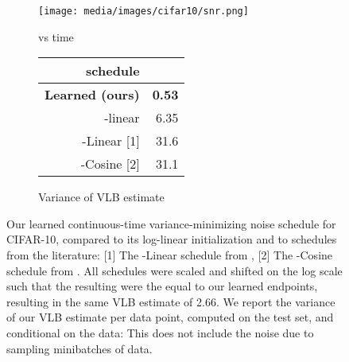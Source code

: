 \documentclass{article}
\begin{document}
\begin{figure}[t]
    \centering\footnotesize
    \begin{subfigure}[b]{0.35\textwidth}
        \centering
        \texttt{[image: media/images/cifar10/snr.png]}
        \caption{ vs time  }
        \label{fig:snr_schedule}
    \end{subfigure}\hspace{1.5cm}
    \begin{subfigure}[b]{0.35\textwidth}  
        \centering
        \begin{tabular}{rr}
        ~schedule & \\
        \midrule
        \textbf{Learned (ours)} & \textbf{0.53}\\
        -linear & 6.35\\
        -Linear [1] & 31.6\\
        -Cosine [2] & 31.1\\
        \bottomrule
        \end{tabular}
        \caption{Variance of VLB estimate}
        \label{table:variance}
    \end{subfigure}
    \caption{Our learned continuous-time variance-minimizing noise schedule  for CIFAR-10, compared to its log-linear initialization and to schedules from the literature: [1] The -Linear schedule from \cite{ho2020denoising}, [2] The -Cosine schedule from \cite{nichol2021improved}. All schedules were scaled and shifted on the log scale such that the resulting  were the equal to our learned endpoints, resulting in the same VLB estimate of 2.66. We report the variance of our VLB estimate per data point, computed on the test set, and conditional on the data: This does not include the noise due to sampling minibatches of data.}
\end{figure}
\end{document}
